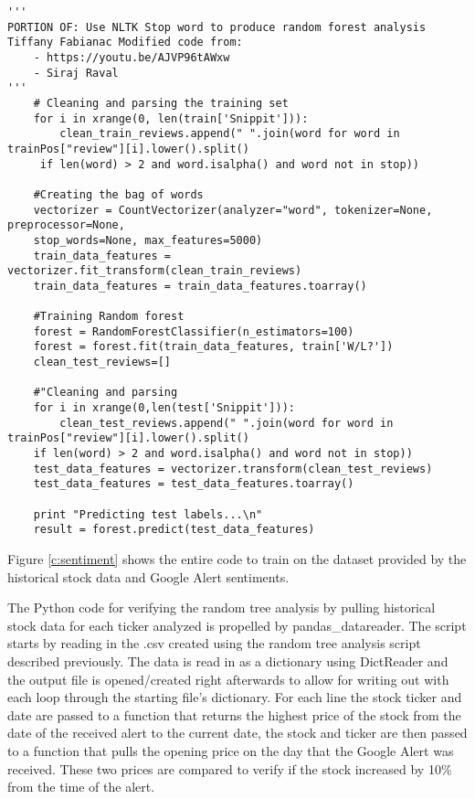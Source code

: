 \documentclass[sigconf]{acmart}
\begin{document}
\begin{figure*}[htb]
\begin{verbatim}
'''
PORTION OF: Use NLTK Stop word to produce random forest analysis 
Tiffany Fabianac Modified code from:
    - https://youtu.be/AJVP96tAWxw
    - Siraj Raval
'''
    # Cleaning and parsing the training set
    for i in xrange(0, len(train['Snippit'])):
        clean_train_reviews.append(" ".join(word for word in trainPos["review"][i].lower().split()
     if len(word) > 2 and word.isalpha() and word not in stop))

    #Creating the bag of words
    vectorizer = CountVectorizer(analyzer="word", tokenizer=None, preprocessor=None, 
    stop_words=None, max_features=5000)
    train_data_features = vectorizer.fit_transform(clean_train_reviews)
    train_data_features = train_data_features.toarray()

    #Training Random forest
    forest = RandomForestClassifier(n_estimators=100)
    forest = forest.fit(train_data_features, train['W/L?'])
    clean_test_reviews=[]

    #"Cleaning and parsing
    for i in xrange(0,len(test['Snippit'])):
        clean_test_reviews.append(" ".join(word for word in trainPos["review"][i].lower().split() 
    if len(word) > 2 and word.isalpha() and word not in stop))
    test_data_features = vectorizer.transform(clean_test_reviews)
    test_data_features = test_data_features.toarray()

    print "Predicting test labels...\n"
    result = forest.predict(test_data_features)
\end{verbatim}
\caption{The Sentiment Python code takes the .csv exported by the historical stock script and parses the Snippets to train on the stock script and apply it to more recent stock quotes and Google Alerts}\label{c:sentiment}
\end{figure*}

Figure \ref{c:sentiment} shows the entire code to train on the dataset provided by the historical stock data and Google Alert sentiments.

The Python code for verifying the random tree analysis by pulling historical stock data for each ticker analyzed is propelled by pandas\_datareader. The script starts by reading in the .csv created using the random tree analysis script described previously. The data is read in as a dictionary using DictReader and the output file is opened/created right afterwards to allow for writing out with each loop through the starting file's dictionary. For each line the stock ticker and date are passed to a function that returns the highest price of the stock from the date of the received alert to the current date, the stock and ticker are then passed to a function that pulls the opening price on the day that the Google Alert was received. These two prices are compared to verify if the stock increased by 10\% from the time of the alert. 
\end{document}
